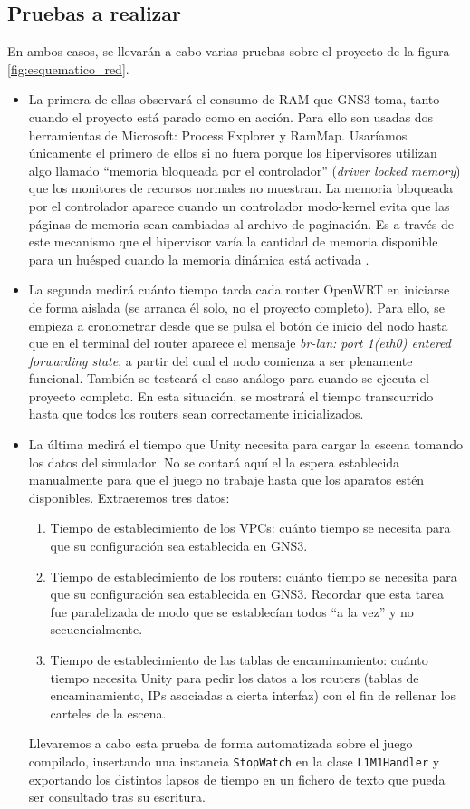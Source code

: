 \subsection{Pruebas a realizar}

En ambos casos, se llevarán a cabo varias pruebas sobre el proyecto de la figura \ref{fig:esquematico_red}.
\begin{itemize}
\item La primera de ellas observará el consumo de RAM que GNS3 toma, tanto cuando el proyecto está parado como en acción. Para ello son usadas dos herramientas de Microsoft: Process Explorer y RamMap. Usaríamos únicamente el primero de ellos si no fuera porque los hipervisores utilizan algo llamado ``memoria bloqueada por el controlador'' (\textit{driver locked memory}) que los monitores de recursos normales no muestran. La memoria bloqueada por el controlador aparece cuando un controlador modo-kernel evita que las páginas de memoria sean cambiadas al archivo de paginación. Es a través de este mecanismo que el hipervisor varía la cantidad de memoria disponible para un huésped cuando la memoria dinámica está activada \cite{dlm}.
\item La segunda medirá cuánto tiempo tarda cada router OpenWRT en iniciarse de forma aislada (se arranca él solo, no el proyecto completo). Para ello, se empieza a cronometrar desde que se pulsa el botón de inicio del nodo hasta que en el terminal del router aparece el mensaje \textit{br-lan: port 1(eth0) entered forwarding state}, a partir del cual el nodo comienza a ser plenamente funcional. También se testeará el caso análogo para cuando se ejecuta el proyecto completo. En esta situación, se mostrará el tiempo transcurrido hasta que todos los routers sean correctamente inicializados.
\item La última medirá el tiempo que Unity necesita para cargar la escena tomando los datos del simulador. No se contará aquí el la espera establecida manualmente para que el juego no trabaje hasta que los aparatos estén disponibles. Extraeremos tres datos:
\begin{enumerate}
\item Tiempo de establecimiento de los VPCs: cuánto tiempo se necesita para que su configuración sea establecida en GNS3.
\item Tiempo de establecimiento de los routers: cuánto tiempo se necesita para que su configuración sea establecida en GNS3. Recordar que esta tarea fue paralelizada de modo que se establecían todos ``a la vez'' y no secuencialmente.
\item Tiempo de establecimiento de las tablas de encaminamiento: cuánto tiempo necesita Unity para pedir los datos a los routers (tablas de encaminamiento, IPs asociadas a cierta interfaz) con el fin de rellenar los carteles de la escena.
\end{enumerate}
Llevaremos a cabo esta prueba de forma automatizada sobre el juego compilado, insertando una instancia \texttt{StopWatch} en la clase \texttt{L1M1Handler} y exportando los distintos lapsos de tiempo en un fichero de texto que pueda ser consultado tras su escritura.
\end{itemize}

